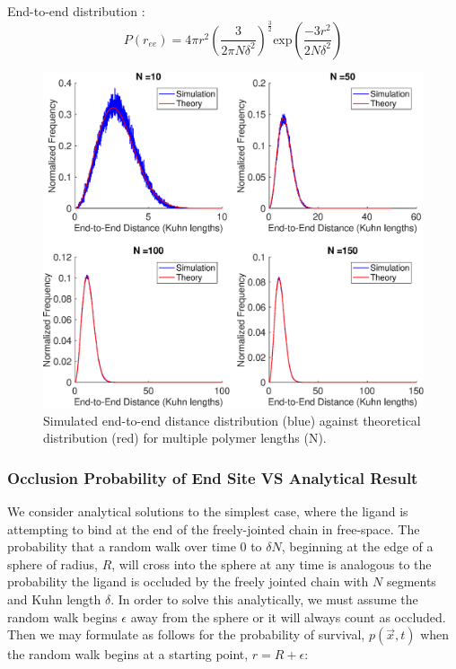 \documentclass[../AdvancementSummary.tex]{subfiles}
\begin{document}
End-to-end distribution \cite{VanValen2009, Reeves2011}:
\begin{equation*}
P(r_{ee}) = 4\pi r^2 \left( \frac{3}{2\pi N \delta^2}\right)^{\frac{3}{2}}\text{exp}\left(\frac{-3r^2}{2N \delta^2}\right)
\end{equation*}


\begin{figure}[H]
\begin{center}
\includegraphics[width=0.8\linewidth]{ModelConfirmationFigures/ReeDistribution.eps}
\caption{Simulated end-to-end distance distribution (blue) against theoretical distribution (red) for multiple polymer lengths (N). \label{fig: ReeDist}}
\end{center}
\end{figure}

\subsubsection{Occlusion Probability of End Site VS Analytical Result}

We consider analytical solutions to the simplest case, where the ligand is attempting to bind at the end of the freely-jointed chain in free-space. The probability that a random walk over time 0 to $\delta N$, beginning at the edge of a sphere of radius, $R$, will cross into the sphere at any time is analogous to the probability the ligand is occluded by the freely jointed chain with $N$ segments and Kuhn length $\delta$. In order to solve this analytically, we must assume the random walk begins $\epsilon$ away from the sphere or it will always count as occluded. Then we may formulate as follows for the probability of survival, $p(\vec{x},t)$ when the random walk begins at a starting point, $r=R+\epsilon$:
\end{document}
